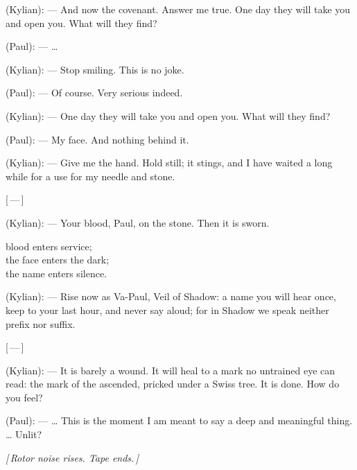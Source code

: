 \begin{room}
(Kylian): --- And now the covenant. Answer me true. One day they will take you and open you. What will they find?

(Paul): --- \ldots{}

(Kylian): --- Stop smiling. This is no joke.

(Paul): --- Of course. Very serious indeed.

(Kylian): --- One day they will take you and open you. What will they find?

(Paul): --- My face. And nothing behind it.

(Kylian): --- Give me the hand. Hold still; it stings, and I have waited a long while for a use for my needle and stone.

\centerline{[\,---\,]}

(Kylian): --- Your blood, Paul, on the stone. Then it is sworn.

\begin{scripture}
blood enters service; \\
the face enters the dark; \\
the name enters silence.
\end{scripture}

(Kylian): --- Rise now as Va-Paul, Veil of Shadow: a name you will hear once, keep to your last hour, and never say aloud; for in Shadow we speak neither prefix nor suffix.

\centerline{[\,---\,]}

(Kylian): --- It is barely a wound. It will heal to a mark no untrained eye can read: the mark of the ascended, pricked under a Swiss tree. It is done. How do you feel?

(Paul): --- \ldots{} This is the moment I am meant to say a deep and meaningful thing. \ldots{} Unlit?

\centerline{\textit{[\,Rotor noise rises. Tape ends.\,]}}

\end{room}
